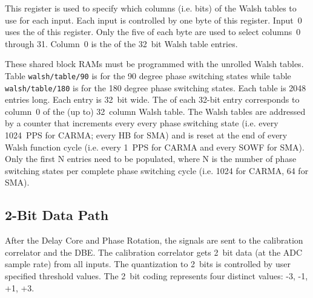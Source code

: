 \documentclass[12pt]{article}
\begin{document}
\begin{description}

 This register is used to specify which columns (i.e. bits)
of the Walsh tables to use for each input.  Each input is controlled by one
byte of this register.  Input~0 uses the \LSB of this register.  Only the five
\LSbs of each byte are used to select columns~0 through 31.  Column~0 is the
\MSb of the 32~bit Walsh table entries.

\end{description}

\begin{description}

  These shared block RAMs must be
programmed with the unrolled Walsh tables.  Table \verb|walsh/table/90| is for
the 90 degree phase switching states while table \verb|walsh/table/180| is for
the 180 degree phase switching states.  Each table is 2048 entries long.  Each
entry is 32~bit wide.  The \MSb of each 32-bit entry corresponds to column~0 of
the (up to) 32~column Walsh table.  The Walsh tables are addressed by a counter
that increments every every phase switching state (i.e. every 1024~PPS for
CARMA; every HB for SMA) and is reset at the end of every Walsh function cycle
(i.e. every 1~PPS for CARMA and every SOWF for SMA).  Only the first N entries
need to be populated, where N is the number of phase switching states per
complete phase switching cycle (i.e. 1024 for CARMA, 64 for SMA).

\end{description}

  \subsection{2-Bit Data Path}

After the Delay Core and Phase Rotation, the signals are sent to the
calibration correlator and the DBE.  The calibration correlator gets 2~bit data
(at the ADC sample rate) from all inputs.  The quantization to 2~bits is
controlled by user specified threshold values.  The 2~bit coding represents
four distinct values: -3, -1, +1, +3.
\end{document}
